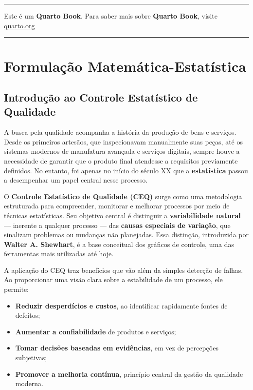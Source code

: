\documentclass[
  portuguese,
  11pt,
  a4paper,
  DIV=11,
  numbers=noendperiod]{scrreprt}
\providecommand{\tightlist}{%
  \setlength{\itemsep}{0pt}\setlength{\parskip}{0pt}}
\begin{document}
\begin{center}\hrule\end{center}

Este é um \textbf{Quarto Book}. Para saber mais sobre \textbf{Quarto Book}, visite \href{https://quarto.org/docs/books/}{quarto.org}

\begin{center}\hrule\end{center}

\part{Formulação Matemática-Estatística}


\chapter{Introdução ao Controle Estatístico de
Qualidade}\label{introduuxe7uxe3o-ao-controle-estatuxedstico-de-qualidade}

A busca pela qualidade acompanha a história da produção de bens e
serviços. Desde os primeiros artesãos, que inspecionavam manualmente
suas peças, até os sistemas modernos de manufatura avançada e serviços
digitais, sempre houve a necessidade de garantir que o produto final
atendesse a requisitos previamente definidos. No entanto, foi apenas no
início do século XX que a \textbf{estatística} passou a desempenhar um
papel central nesse processo.

O \textbf{Controle Estatístico de Qualidade (CEQ)} surge como uma
metodologia estruturada para compreender, monitorar e melhorar processos
por meio de técnicas estatísticas. Seu objetivo central é distinguir a
\textbf{variabilidade natural} --- inerente a qualquer processo --- das
\textbf{causas especiais de variação}, que sinalizam problemas ou
mudanças não planejadas. Essa distinção, introduzida por \textbf{Walter
A. Shewhart}, é a base conceitual dos gráficos de controle, uma das
ferramentas mais utilizadas até hoje.

A aplicação do CEQ traz benefícios que vão além da simples detecção de
falhas. Ao proporcionar uma visão clara sobre a estabilidade de um
processo, ele permite:

\begin{itemize}
\tightlist
\item
  \textbf{Reduzir desperdícios e custos}, ao identificar rapidamente
  fontes de defeitos;
\item
  \textbf{Aumentar a confiabilidade} de produtos e serviços;
\item
  \textbf{Tomar decisões baseadas em evidências}, em vez de percepções
  subjetivas;
\item
  \textbf{Promover a melhoria contínua}, princípio central da gestão da
  qualidade moderna.
\end{itemize}
\end{document}
